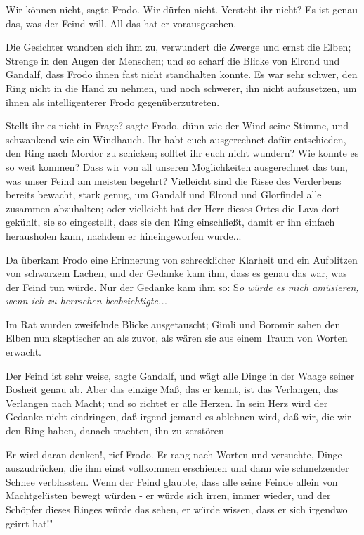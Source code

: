 \glqq Wir können nicht\grqq{}, sagte Frodo. \glqq Wir dürfen nicht. Versteht ihr
nicht? Es ist genau das, was der Feind will. All das hat er
vorausgesehen.\grqq{}

Die Gesichter wandten sich ihm zu, verwundert die Zwerge und ernst die Elben;
Strenge in den Augen der Menschen; und so scharf die Blicke von Elrond und
Gandalf, dass Frodo ihnen fast nicht standhalten konnte. Es war sehr schwer, den
Ring nicht in die Hand zu nehmen, und noch schwerer, ihn nicht aufzusetzen, um
ihnen als intelligenterer Frodo gegenüberzutreten.

\glqq Stellt ihr es nicht in Frage?\grqq{} sagte Frodo, dünn wie der Wind seine
Stimme, und schwankend wie ein Windhauch. \glqq Ihr habt euch ausgerechnet dafür
entschieden, den Ring nach Mordor zu schicken; solltet ihr euch nicht wundern?
Wie konnte es so weit kommen? Dass wir von all unseren Möglichkeiten
ausgerechnet das tun, was unser Feind am meisten begehrt? Vielleicht sind die
Risse des Verderbens bereits bewacht, stark genug, um Gandalf und Elrond und
Glorfindel alle zusammen abzuhalten; oder vielleicht hat der Herr dieses Ortes
die Lava dort gekühlt, sie so eingestellt, dass sie den Ring einschließt, damit
er ihn einfach herausholen kann, nachdem er hineingeworfen wurde...\grqq{}

Da überkam Frodo eine Erinnerung von schrecklicher Klarheit und ein Aufblitzen
von schwarzem Lachen, und der Gedanke kam ihm, dass es genau das war, was der
Feind tun würde. Nur der Gedanke kam ihm so: S\emph{o würde es mich amüsieren,
wenn ich zu herrschen beabsichtigte...}

Im Rat wurden zweifelnde Blicke ausgetauscht; Gimli und Boromir sahen den Elben
nun skeptischer an als zuvor, als wären sie aus einem Traum von Worten erwacht.

\glqq Der Feind ist sehr weise\grqq{}, sagte Gandalf, \glqq und wägt alle Dinge
in der Waage seiner Bosheit genau ab. Aber das einzige Maß, das er kennt, ist
das Verlangen, das Verlangen nach Macht; und so richtet er alle Herzen. In sein
Herz wird der Gedanke nicht eindringen, daß irgend jemand es ablehnen wird, daß
wir, die wir den Ring haben, danach trachten, ihn zu zerstören -\grqq{}

\glqq Er wird daran denken!\grqq{}, rief Frodo. Er rang nach Worten und
versuchte, Dinge auszudrücken, die ihm einst vollkommen erschienen und dann wie
schmelzender Schnee verblassten. \glqq Wenn der Feind glaubte, dass alle seine
Feinde allein von Machtgelüsten bewegt würden - er würde sich irren, immer
wieder, und der Schöpfer dieses Ringes würde das sehen, er würde wissen, dass er
sich irgendwo geirrt hat!"

